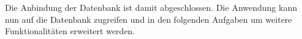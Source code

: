 Die Anbindung der Datenbank ist damit abgeschlossen. Die Anwendung kann nun auf die Datenbank zugreifen und in den folgenden Aufgaben um weitere Funktionalitäten erweitert werden.

